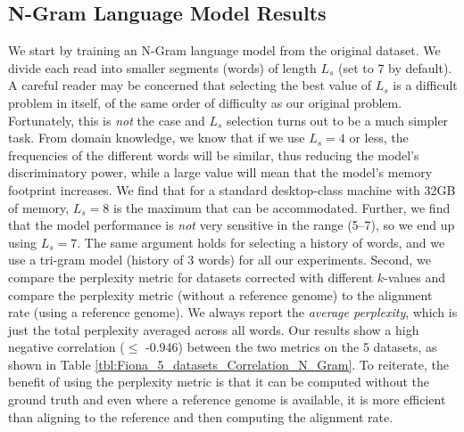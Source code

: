 \vspace{-15pt}
\subsection{N-Gram Language Model Results}
\vspace{-5pt}
We start by training an N-Gram language model from the original dataset. We divide each read into smaller segments (words) of length $L_s$ (set to 7 by default). A careful reader may be concerned that selecting the best value of $L_s$ is a difficult problem in itself, of the same order of difficulty as our original problem. Fortunately, this is {\em not} the case and $L_s$ selection turns out to be a much simpler task. From domain knowledge, 
we know that if we use $L_s = 4$ or less, the frequencies of the different words will be similar,
thus reducing the model's discriminatory power, while a large value will mean that the model's memory footprint increases. We find that for a standard desktop-class machine with 32GB of memory, $L_s = 8$ is the maximum that can be accommodated. Further, we find that the model performance is {\em not} very sensitive in the range (5--7), so we end up using $L_s = 7$.
The same argument holds for selecting a history of words, and we use a tri-gram model (history of 3 words) for all our experiments.
Second, we compare the perplexity metric for datasets corrected with different $k$-values and compare the perplexity metric (without a reference genome) to the alignment rate (using a reference genome). 
We always report the \textit{average perplexity}, which is just the total perplexity averaged across all words.
Our results show a high negative correlation ($\leq$ -0.946) between the two  metrics on the 5 datasets, as shown in Table \ref{tbl:Fiona_5_datasets_Correlation_N_Gram}. %
To reiterate, the benefit of using the perplexity metric is that it can be computed without the ground truth and even where a reference genome is available, it is more efficient than aligning to the reference and then computing the alignment rate. 


